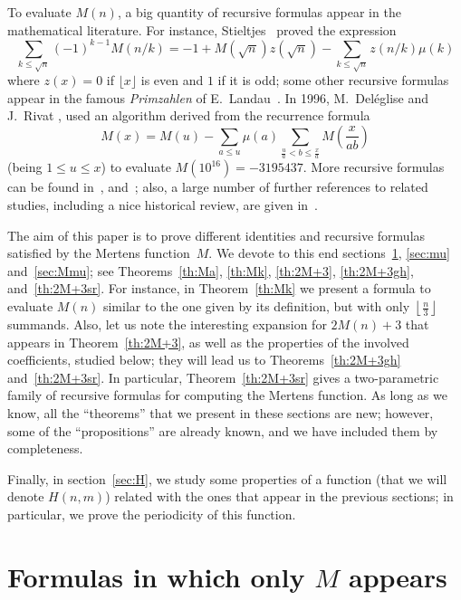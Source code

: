\documentclass[10pt]{amsart}
\begin{document}
To evaluate $M(n)$, a big quantity of recursive formulas appear in the mathematical literature.
For instance, Stieltjes~\cite[Letter~79, p.~163]{Her} proved the expression
\begin{equation} 
\label{eq:Stiel}
\sum_{k \le \sqrt n} (-1)^{k-1} M(n/k) 
= -1 + M(\sqrt n) z(\sqrt n) - \sum_{k \le \sqrt n } z(n/k)  \mu(k)
\end{equation}
where $z(x) = 0$ if $\lfloor x\rfloor$ is even and $1$ if it is odd;
some other recursive formulas appear in the famous \textit{Primzahlen} of E.~Landau~\cite{Lan}.
In 1996, M.~Del\'eglise and J.~Rivat \cite{DeRi},
used an algorithm derived from the recurrence formula
\begin{equation}
\label{eq:DR}
M(x) = M(u) - \sum_{a \leq u} \mu(a) \sum_{\frac ua < b \leq \frac xa}
M\left( \frac x{ab}\right)
\end{equation}
(being  $1 \leq u \leq x$) to evaluate $M(10^{16}) = -3195437$.
More recursive formulas can be found in~\cite{Neu}, and~\cite{Dr}; also,
a large number of further references to related studies, including a nice historical review, 
are given in~\cite{Rie}.

The aim of this paper is to prove different identities and recursive
formulas satisfied by the Mertens function~$M$.
We devote to this end sections~\ref{sec:M}, \ref{sec:mu} and~\ref{sec:Mmu};
see Theorems~\ref{th:Ma}, \ref{th:Mk},
\ref{th:2M+3}, \ref{th:2M+3gh}, and~\ref{th:2M+3sr}.
For instance, in Theorem~\ref{th:Mk} we present a formula to
evaluate $M(n)$ similar to the one given by its definition,
but with only $\left\lfloor\frac n3\right\rfloor$ summands.
Also, let us note the interesting expansion for $2M(n)+3$
that appears in Theorem~\ref{th:2M+3}, as well as the properties of the
involved coefficients, studied below; they will lead us to
Theorems~\ref{th:2M+3gh} and~\ref{th:2M+3sr}.
In particular, Theorem~\ref{th:2M+3sr} gives a two-parametric family
of recursive formulas for computing the Mertens function.
As long as we know, all the ``theorems'' that we present in these sections
are new; however, some of the ``propositions'' are already known, and we have included
them by completeness.

Finally, in section~\ref{sec:H}, we study some properties
of a function (that we will denote $H(n,m)$)
related with the ones that appear in the previous
sections; in particular, we prove the periodicity of this function.


\section{Formulas in which only $M$ appears}
\label{sec:M}
\end{document}
